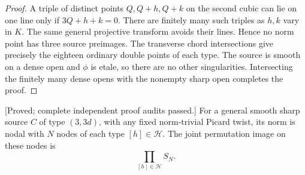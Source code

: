 \begin{proof}
A triple of distinct points $Q,Q+h,Q+k$ on the second cubic can
lie on one line only if $3Q+h+k=0$. There are finitely many such
triples as $h,k$ vary in $K$. The same general projective transform
avoids their lines. Hence no norm point has three source preimages.
The transverse chord intersections give precisely the eighteen
ordinary double points of each type. The source is smooth on a
dense open and $\phi$ is etale, so there are no other singularities.
Intersecting the finitely many dense opens with the nonempty sharp
open completes the proof.
\end{proof}

\begin{lemma}
\label{lem:mixed-odd-node-product-candidate}
\textup{[Proved; complete independent proof audits passed.]}
For a general smooth sharp source $C$ of type $(3,3d)$, with any
fixed norm-trivial Picard twist, its norm is nodal with $N$ nodes
of each type $[h]\in\mathcal H$. The joint permutation image on
these nodes is
\[
                         \prod_{[h]\in\mathcal H}S_N.
\]
\end{lemma}
